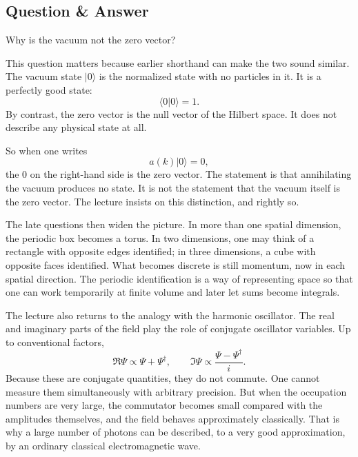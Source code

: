 \subsection{Question \& Answer}

Why is the vacuum not the zero vector?

This question matters because earlier shorthand can make the two sound similar. The vacuum state \(|0\rangle\) is the normalized state with no particles in it. It is a perfectly good state:
\begin{equation}
\langle 0|0\rangle = 1.
\end{equation}
By contrast, the zero vector is the null vector of the Hilbert space. It does not describe any physical state at all.

So when one writes
\begin{equation}
a(k)|0\rangle = 0,
\end{equation}
the \(0\) on the right-hand side is the zero vector. The statement is that annihilating the vacuum produces no state. It is not the statement that the vacuum itself is the zero vector. The lecture insists on this distinction, and rightly so.

The late questions then widen the picture. In more than one spatial dimension, the periodic box becomes a torus. In two dimensions, one may think of a rectangle with opposite edges identified; in three dimensions, a cube with opposite faces identified. What becomes discrete is still momentum, now in each spatial direction. The periodic identification is a way of representing space so that one can work temporarily at finite volume and later let sums become integrals.

The lecture also returns to the analogy with the harmonic oscillator. The real and imaginary parts of the field play the role of conjugate oscillator variables. Up to conventional factors,
\begin{equation}
\Re \Psi \propto \Psi+\Psi^\dagger,
\qquad
\Im \Psi \propto \frac{\Psi-\Psi^\dagger}{i}.
\end{equation}
Because these are conjugate quantities, they do not commute. One cannot measure them simultaneously with arbitrary precision. But when the occupation numbers are very large, the commutator becomes small compared with the amplitudes themselves, and the field behaves approximately classically. That is why a large number of photons can be described, to a very good approximation, by an ordinary classical electromagnetic wave.

